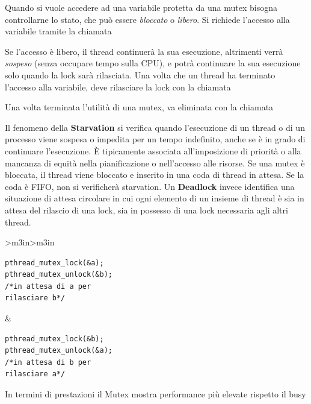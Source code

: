 \documentclass[10pt, letterpaper]{report}
\begin{document}
Quando si vuole accedere ad una variabile protetta da una mutex bisogna controllarne lo stato, che può 
essere \textit{bloccato} o \textit{libero}. Si richiede l'accesso alla variabile tramite la chiamata 
\begin{quote}
\end{quote} 
Se l'accesso è libero, il thread continuerà la sua esecuzione, altrimenti verrà \textit{sospeso} (senza 
occupare tempo sulla CPU), e potrà continuare la sua esecuzione solo quando la lock sarà rilasciata.\acc 
Una volta che un thread ha terminato l'accesso alla variabile, deve rilasciare la lock con la chiamata 
\begin{quote}
\end{quote} 
Una volta terminata l'utilità di una mutex, va eliminata con la chiamata \begin{quote}
\end{quote}
Il fenomeno della \textbf{Starvation} si verifica quando l'esecuzione di un thread o di un
 processo viene sospesa o impedita per un tempo indefinito, anche se è in grado di continuare 
 l'esecuzione. È tipicamente associata all'imposizione di priorità o alla mancanza di equità nella 
 pianificazione o nell'accesso alle risorse.
Se una mutex è bloccata, il thread viene bloccato e inserito in una coda di thread in attesa. Se la coda è FIFO, non si verificherà starvation.
\acc 
Un \textbf{Deadlock} invece identifica una situazione di attesa circolare in cui ogni elemento di un insieme 
di thread è sia in attesa del rilascio di una lock, sia in possesso di una lock necessaria agli altri thread. 
\begin{center}
	\begin{tabular}{>{\centering\arraybackslash}m{3in}>{\arraybackslash}m{3in}}
    \begin{lstlisting}[style=CStyle]
pthread_mutex_lock(&a); 
pthread_mutex_unlock(&b);
/*in attesa di a per 
rilasciare b*/
\end{lstlisting}&
        \begin{lstlisting}[style=CStyle]
pthread_mutex_lock(&b); 
pthread_mutex_unlock(&a);
/*in attesa di b per 
rilasciare a*/
\end{lstlisting}
	\end{tabular}
\end{center}
In termini di prestazioni il Mutex mostra performance più elevate rispetto il busy 
\end{document}
